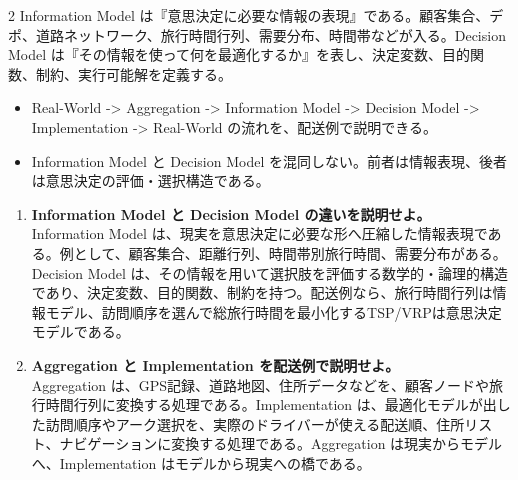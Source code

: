 \begin{multicols}{2}
Information Model は『意思決定に必要な情報の表現』である。顧客集合、デポ、道路ネットワーク、旅行時間行列、需要分布、時間帯などが入る。Decision Model は『その情報を使って何を最適化するか』を表し、決定変数、目的関数、制約、実行可能解を定義する。\par
{}
\begin{itemize}
\item Real-World -> Aggregation -> Information Model -> Decision Model -> Implementation -> Real-World の流れを、配送例で説明できる。
\item Information Model と Decision Model を混同しない。前者は情報表現、後者は意思決定の評価・選択構造である。
\end{itemize}
\begin{enumerate}
\item \textbf{Information Model と Decision Model の違いを説明せよ。}\\Information Model は、現実を意思決定に必要な形へ圧縮した情報表現である。例として、顧客集合、距離行列、時間帯別旅行時間、需要分布がある。Decision Model は、その情報を用いて選択肢を評価する数学的・論理的構造であり、決定変数、目的関数、制約を持つ。配送例なら、旅行時間行列は情報モデル、訪問順序を選んで総旅行時間を最小化するTSP/VRPは意思決定モデルである。
\item \textbf{Aggregation と Implementation を配送例で説明せよ。}\\Aggregation は、GPS記録、道路地図、住所データなどを、顧客ノードや旅行時間行列に変換する処理である。Implementation は、最適化モデルが出した訪問順序やアーク選択を、実際のドライバーが使える配送順、住所リスト、ナビゲーションに変換する処理である。Aggregation は現実からモデルへ、Implementation はモデルから現実への橋である。
\end{enumerate}
\end{multicols}

